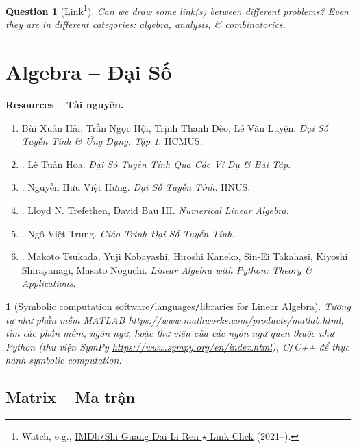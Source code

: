\documentclass{article}
\newtheorem{baitoan}{}
\newtheorem{question}{Question}
\begin{document}
\begin{question}[Link\footnote{Watch, e.g., \href{https://www.imdb.com/title/tt14976292/}{IMDb{\tt/}Shi Guang Dai Li Ren $\star$ Link Click} (2021--).}]
	Can we draw some link(s) between different problems? Even they are in different categories: algebra, analysis, \& combinatorics.
\end{question}


\section{Algebra -- Đại Số}
\textbf{\textsf{Resources -- Tài nguyên.}}
\begin{enumerate}
	\item {\sc Bùi Xuân Hải, Trần Ngọc Hội, Trịnh Thanh Đèo, Lê Văn Luyện}. {\it Đại Số Tuyến Tính \& Ứng Dụng. Tập 1}. HCMUS.
	\item \cite{Hoa_linear_algebra}. {\sc Lê Tuấn Hoa}. {\it Đại Số Tuyến Tính Qua Các Ví Dụ \& Bài Tập}.
	\item \cite{Hung_linear_algebra}. {\sc Nguyễn Hữu Việt Hưng}. {\it Đại Số Tuyến Tính}. HNUS.
	\item \cite{Trefethen_Bau1997,Trefethen_Bau2022}. {\sc Lloyd N. Trefethen, David Bau III}. {\it Numerical Linear Algebra}.
	\item \cite{Trung_linear_algebra}. {\sc Ngô Việt Trung}. {\it Giáo Trình Đại Số Tuyến Tính}.
	\item \cite{Tsukada_Kobayashi_Kaneko_Takahasi_Shirayanagi_Noguchi2023}. {\sc Makoto Tsukada, Yuji Kobayashi, Hiroshi Kaneko, Sin-Ei Takahasi, Kiyoshi Shirayanagi, Masato Noguchi}. {\it Linear Algebra with Python: Theory \& Applications}.
\end{enumerate}

\begin{baitoan}[Symbolic computation software{\tt/}languages{\tt/}libraries for Linear Algebra]
	Tương tự như phần mềm {\sf MATLAB} \url{https://www.mathworks.com/products/matlab.html}, tìm các phần mềm, ngôn ngữ, hoặc thư viện của các ngôn ngữ quen thuộc như {\sf Python} (thư viện {\sf SymPy} \url{https://www.sympy.org/en/index.html}), {\sf C{\tt/}C++} để thực hành symbolic computation.
\end{baitoan}


\subsection{Matrix -- Ma trận}
\end{document}
